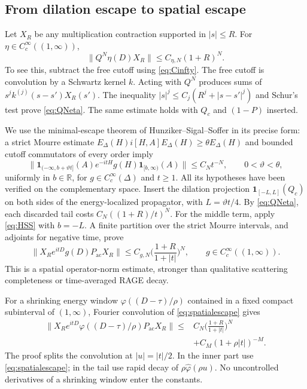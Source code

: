 \documentclass[11pt]{amsart}
\numberwithin{equation}{section}
\theoremstyle{remark}
\newcommand{\R}{\mathbb{R}}
\newcommand{\one}{\mathbf{1}}
\begin{document}
\subsection{From dilation escape to spatial escape}
Let $X_R$ be any multiplication contraction supported in $|s|\le R$. For $\eta\in C_c^\infty((1,\infty))$,
\begin{equation}\label{eq:QNeta}
\|Q^N\eta(D)X_R\|\le C_{\eta,N}(1+R)^N .
\end{equation}
To see this, subtract the free cutoff using \eqref{eq:Cinfty}. The free cutoff is convolution by a Schwartz kernel $k$. Acting with $Q^N$ produces sums of $s^jk^{(j)}(s-s')X_R(s')$. The inequality $|s|^j\le C_j(R^j+|s-s'|^j)$ and Schur's test prove \eqref{eq:QNeta}. The same estimate holds with $Q_c$ and $(1-P)$ inserted.

We use the minimal-escape theorem of Hunziker--Sigal--Soffer \cite[Theorem~1.1]{HSS} in its precise form: a strict Mourre estimate $E_\Delta(H)i[H,A]E_\Delta(H)\ge\theta E_\Delta(H)$ and bounded cutoff commutators of every order imply
\begin{equation}\label{eq:HSS}
\big\|\one_{(-\infty,b+\vartheta t]}(A)e^{-itH}g(H)\one_{[b,\infty)}(A)\big\|\le C_Nt^{-N},\qquad 0<\vartheta<\theta,
\end{equation}
uniformly in $b\in\R$, for $g\in C_c^\infty(\Delta)$ and $t\ge1$. All its hypotheses have been verified on the complementary space. Insert the dilation projection $\one_{[-L,L]}(Q_c)$ on both sides of the energy-localized propagator, with $L=\vartheta t/4$. By \eqref{eq:QNeta}, each discarded tail costs $C_N((1+R)/t)^N$. For the middle term, apply \eqref{eq:HSS} with $b=-L$. A finite partition over the strict Mourre intervals, and adjoints for negative time, prove
\begin{equation}\label{eq:spatialescape}
\|X_Re^{itD}g(D)P_{\mathrm{ac}}X_R\|\le C_{g,N}\Big(\frac{1+R}{1+|t|}\Big)^N,\qquad g\in C_c^\infty((1,\infty)) .
\end{equation}
This is a spatial operator-norm estimate, stronger than qualitative scattering completeness or time-averaged RAGE decay.

For a shrinking energy window $\varphi((D-\tau)/\rho)$ contained in a fixed compact subinterval of $(1,\infty)$, Fourier convolution of \eqref{eq:spatialescape} gives
\begin{equation}\label{eq:shrinkingwindow}
\begin{aligned}
\|X_Re^{itD}\varphi((D-\tau)/\rho)P_{\mathrm{ac}}X_R\|\le{}&C_N\Big(\frac{1+R}{1+|t|}\Big)^N\\
&+C_M(1+\rho|t|)^{-M} .
\end{aligned}
\end{equation}
The proof splits the convolution at $|u|=|t|/2$. In the inner part use \eqref{eq:spatialescape}; in the tail use rapid decay of $\rho\widehat\varphi(\rho u)$. No uncontrolled derivatives of a shrinking window enter the constants.
\end{document}
